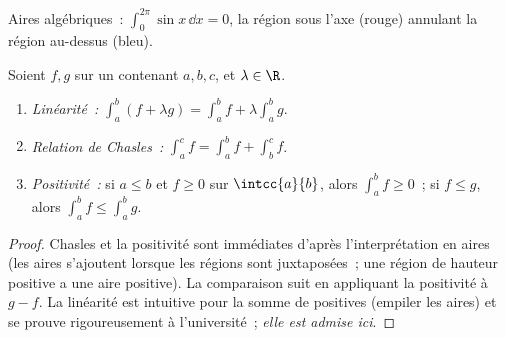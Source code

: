 \begin{omfigure}

{\small Aires algébriques~: $\int_0^{2\pi} \sin x\,\dd x = 0$, la région
sous l'axe (rouge) annulant la région au-dessus (bleu).}
\end{omfigure}

\begin{proposition}\label{prop:g12:integ:properties}
Soient $f, g$  sur un  contenant $a, b, c$, et
$\lambda \in \R$.
\begin{enumerate}
  \item \emph{Linéarité~:}
        $\displaystyle\int_a^b (f + \lambda g) = \int_a^b f + \lambda \int_a^b g$.
  \item \emph{Relation de Chasles~:}
        $\displaystyle\int_a^c f = \int_a^b f + \int_b^c f$.
  \item \emph{Positivité~:} si $a \leq b$ et $f \geq 0$ sur $\intcc{a}{b}$,
        alors $\displaystyle\int_a^b f \geq 0$~; si $f \leq g$, alors
        $\displaystyle\int_a^b f \leq \int_a^b g$.
\end{enumerate}
\end{proposition}

\begin{proof}
Chasles et la positivité sont immédiates d'après l'interprétation en aires
(les aires s'ajoutent lorsque les régions sont juxtaposées~; une
région de hauteur positive a une aire positive). La comparaison suit en
appliquant la positivité à $g - f$. La linéarité est intuitive pour la
somme de  positives (empiler les aires) et se prouve
rigoureusement à l'université~; \emph{elle est admise ici}.
\end{proof}


